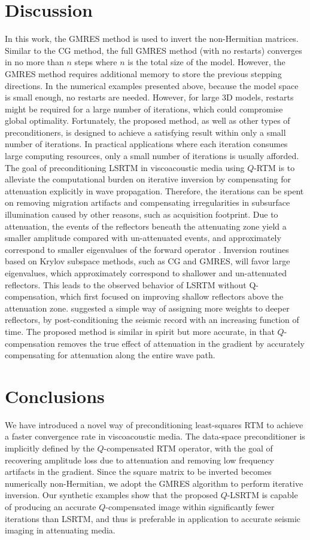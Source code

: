 \section{Discussion}
In this work, the GMRES method is used to invert the non-Hermitian matrices. Similar to the CG method, the full GMRES method (with no restarts) converges in no more than $n$ steps where $n$ is the total size of the model. However, the GMRES method requires additional memory to store the previous stepping directions. In the numerical examples presented above, because the model space is small enough, no restarts are needed. However, for large 3D models, restarts might be required for a large number of iterations, which could compromise global optimality. Fortunately, the proposed method, as well as other types of preconditioners, is designed to achieve a satisfying result within only a small number of iterations. In practical applications where each iteration consumes large computing resources, only a small number of iterations is usually afforded. \\
The goal of preconditioning LSRTM in viscoacoustic media using $Q$-RTM is to alleviate the computational burden on iterative inversion by compensating for attenuation explicitly in wave propagation. Therefore, the iterations can be spent on removing migration artifacts and compensating irregularities in subsurface illumination caused by other reasons, such as acquisition footprint. Due to attenuation, the events of the reflectors beneath the attenuating zone yield a smaller amplitude compared with un-attenuated events, and approximately correspond to smaller eigenvalues of the forward operator \cite[]{blanch94}. Inversion routines based on Krylov subspace methods, such as CG and GMRES, will favor large eigenvalues, which approximately correspond to shallower and un-attenuated reflectors. This leads to the observed behavior of LSRTM without Q-compensation, which first focused on improving shallow reflectors above the attenuation zone. \cite{blanch94} suggested a simple way of assigning more weights to deeper reflectors, by post-conditioning the seismic record with an increasing function of time. The proposed method is similar in spirit but more accurate, in that $Q$-compensation removes the true effect of attenuation in the gradient by accurately compensating for attenuation along the entire wave path. 

\section{Conclusions}
We have introduced a novel way of preconditioning least-squares RTM to achieve a faster convergence rate in viscoacoustic media. The data-space preconditioner is implicitly defined by the $Q$-compensated RTM operator, with the goal of recovering amplitude loss due to attenuation and removing low frequency artifacts in the gradient. Since the square matrix to be inverted becomes numerically non-Hermitian, we adopt the GMRES algorithm to perform iterative inversion. Our synthetic examples show that the proposed $Q$-LSRTM is capable of producing an accurate $Q$-compensated image within significantly fewer iterations than LSRTM, and thus is preferable in application to accurate seismic imaging in attenuating media.


